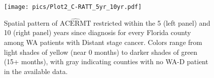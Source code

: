 \documentclass[aoas]{imsart}
\theoremstyle{plain}
\theoremstyle{definition}
\begin{document}



\begin{figure}[ht]
\centering
\texttt{[image: pics/Plot2\_C-RATT\_5yr\_10yr.pdf]}
\caption{Spatial pattern of  $\widehat{\text{ACERMT}}$ restricted within the 5 (left panel) and 10 (right panel) years since diagnosis for every Florida county among WA patients with Distant stage cancer. Colors range from light shades of yellow (near 0 months) to darker shades of green (15+ months), with gray indicating counties with no WA-D patient in the available data.}
\label{fig:county_att}
\end{figure}


\end{document}
